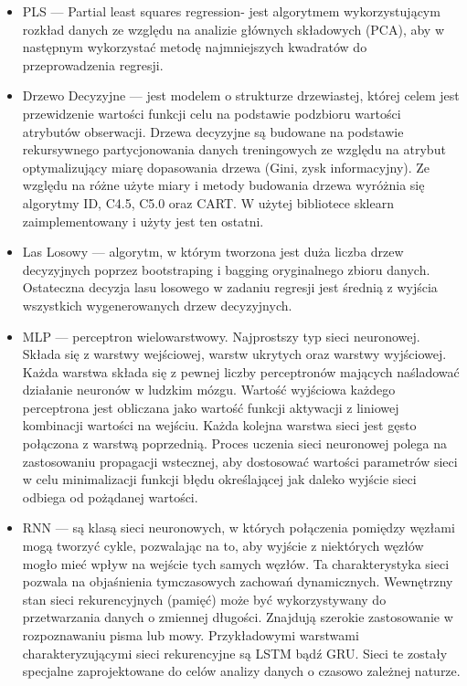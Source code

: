 \begin{itemize}
    \item PLS — Partial least squares regression- jest algorytmem wykorzystującym rozkład
    danych ze względu na analizie głównych składowych (PCA), aby w następnym wykorzystać metodę
    najmniejszych kwadratów do przeprowadzenia regresji.

    \item Drzewo Decyzyjne — jest modelem o strukturze drzewiastej, której celem jest
    przewidzenie wartości funkcji celu na podstawie podzbioru wartości atrybutów obserwacji. 
    Drzewa decyzyjne są budowane na podstawie rekursywnego partycjonowania danych treningowych
    ze względu na atrybut optymalizujący miarę dopasowania drzewa (Gini, zysk informacyjny).
    Ze względu na różne użyte miary i metody budowania drzewa wyróżnia się algorytmy ID, C4.5,
    C5.0 oraz CART. W użytej bibliotece sklearn zaimplementowany i użyty jest ten ostatni.

    \item Las Losowy — algorytm, w którym tworzona jest duża liczba drzew decyzyjnych poprzez
    bootstraping i bagging oryginalnego zbioru danych. Ostateczna decyzja lasu losowego w 
    zadaniu regresji jest średnią z wyjścia wszystkich wygenerowanych drzew decyzyjnych.

    \item MLP — perceptron wielowarstwowy. Najprostszy typ sieci neuronowej. Składa się z 
    warstwy wejściowej, warstw ukrytych oraz warstwy wyjściowej. Każda warstwa składa się
    z pewnej liczby perceptronów mających naśladować działanie neuronów w ludzkim mózgu.
    Wartość wyjściowa każdego perceptrona jest obliczana jako wartość funkcji aktywacji z 
    liniowej kombinacji wartości na wejściu. Każda kolejna warstwa sieci jest gęsto połączona
    z warstwą poprzednią.
    Proces uczenia sieci neuronowej polega na zastosowaniu propagacji wstecznej, aby dostosować
    wartości parametrów sieci w celu minimalizacji funkcji błędu określającej jak daleko
    wyjście sieci odbiega od pożądanej wartości. 

    \item RNN — są klasą sieci neuronowych, w których połączenia pomiędzy węzłami
    mogą tworzyć cykle, pozwalając na to, aby wyjście z niektórych węzłów mogło mieć wpływ na 
    wejście tych samych węzłów. Ta charakterystyka sieci pozwala na objaśnienia tymczasowych 
    zachowań dynamicznych. Wewnętrzny stan sieci rekurencyjnych (pamięć) może być wykorzystywany
    do przetwarzania danych o zmiennej długości. Znajdują szerokie zastosowanie w rozpoznawaniu
    pisma lub mowy. Przykładowymi warstwami charakteryzującymi sieci rekurencyjne są LSTM bądź GRU.
    Sieci te zostały specjalne zaprojektowane do celów analizy danych o czasowo zależnej naturze.


\end{itemize}
